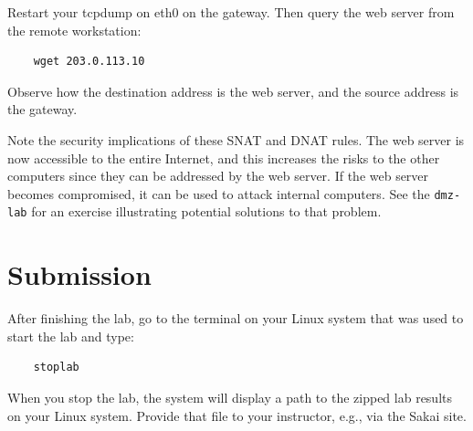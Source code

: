 Restart your tcpdump on eth0 on the gateway.   Then query the web server from the remote workstation:
\begin{verbatim}
    wget 203.0.113.10
\end{verbatim}
Observe how the destination address is the web server, and the source address is the gateway.

Note the security implications of these SNAT and DNAT rules.  The web server is now accessible to the 
entire Internet, and this increases the risks to the other computers since they can be addressed
by the web server. If the web server becomes compromised, it can be used to attack internal computers.
See the {\tt dmz-lab} for an exercise illustrating potential solutions to that problem. 

\section{Submission}
After finishing the lab, go to the terminal on your Linux system that was used to start the lab and type:
\begin{verbatim}
    stoplab 
\end{verbatim}
When you stop the lab, the system will display a path to the zipped lab results on your Linux system.  Provide that file to 
your instructor, e.g., via the Sakai site.

\copyrightnotice


